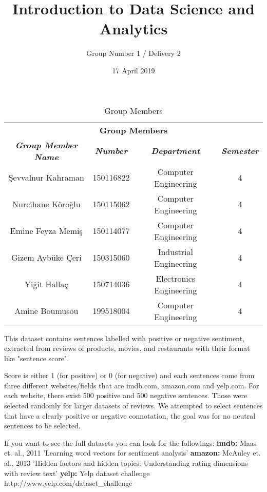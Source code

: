 \documentclass{article}
\title{Introduction to Data Science and Analytics}
\author{Group Number 1 / Delivery 2}
\date{17 April 2019}
\begin{document}
\maketitle

\begin{table}[htbp]
\caption{Group Members}
\begin{center}
\begin{tabular}{|c|c|c|c|}
\hline
\multicolumn{4}{|c|}{\textbf{Group Members}} \\
\cline{1-4} 
\textbf{\textit{Group Member Name}}&
\textbf{\textit{Number}}&
\textbf{\textit{Department}}&
\textbf{\textit{Semester}} \\
\hline
Şevvalnur Kahraman & 150116822 & Computer Engineering & 4 \\
\hline
Nurcihane Köroğlu & 150115062 & Computer Engineering & 4 \\
\hline
Emine Feyza Memiş & 150114077 & Computer Engineering & 4 \\
\hline
Gizem Aybüke Çeri & 150315060 & Industrial Engineering & 4 \\
\hline
Yiğit Hallaç & 150714036 & Electronics Engineering & 4 \\
\hline
Amine Boumusou & 199518004 & Computer Engineering & 4 \\
\hline
\end{tabular}
\label{tab1}
\end{center}
\end{table}

\setlength{\parindent}{4em}
\setlength{\parskip}{1em}
\renewcommand{\baselinestretch}{2.0}
 
This dataset contains sentences labelled with positive or negative sentiment, extracted from reviews of products, movies, and restaurants with their format like "sentence score". 
 
Score is either 1 (for positive) or 0 (for negative) and each sentences come from three different websites/fields that are imdb.com, amazon.com and yelp.com. For each website, there exist 500 positive and 500 negative sentences. Those were selected randomly for larger datasets of reviews. We attempted to select sentences that have a clearly positive or negative connotation, the goal was for no neutral sentences to be selected. 

If you want to see the full datasets you can look for the followings:
\textbf{imdb:} Maas et. al., 2011 'Learning word vectors for sentiment analysis'
\newline \textbf{amazon:} McAuley et. al., 2013 'Hidden factors and hidden topics: Understanding rating dimensions with review text'
\newline \textbf{yelp:} Yelp dataset challenge http://www.yelp.com/dataset\_challenge
\end{document}
